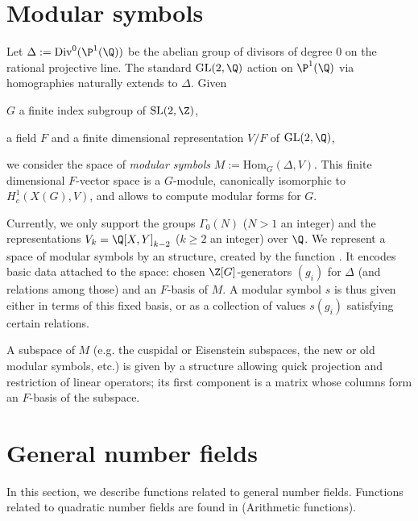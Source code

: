 
\section{Modular symbols}

Let $\Delta := \text{Div}^0(\P^1(\Q))$ be the abelian group of divisors of
degree $0$ on the rational projective line. The standard $\text{GL}(2,\Q)$
action on $\P^1(\Q)$ via homographies naturally extends to $\Delta$. Given

\item $G$ a finite index subgroup of $\text{SL}(2,\Z)$,

\item a field $F$ and a finite dimensional representation $V/F$ of
  $\text{GL}(2,\Q)$,

\noindent we consider the space of \emph{modular symbols} $M :=
\text{Hom}_G(\Delta, V)$. This finite dimensional $F$-vector
space is a $G$-module, canonically isomorphic to $H^1_c(X(G), V)$,
and allows to compute modular forms for $G$.

Currently, we only support the groups $\Gamma_0(N)$ ($N > 1$ an integer)
and the representations $V_k = \Q[X,Y]_{k-2}$ ($k \geq 2$ an integer) over
$\Q$. We represent a space of modular symbols by an  structure,
created by the function . It encodes basic data attached to the
space: chosen $\Z[G]$-generators $(g_i)$ for $\Delta$ (and relations among
those) and an $F$-basis of $M$. A modular symbol $s$ is thus given either in
terms of this fixed basis, or as a collection of values $s(g_i)$
satisfying certain relations.

A subspace of $M$ (e.g. the cuspidal or Eisenstein subspaces, the new or
old modular symbols, etc.) is given by a structure allowing quick projection
and restriction of linear operators; its first component is a matrix whose
columns  form  an $F$-basis  of the subspace.


\section{General number fields}

In this section, we describe functions related to general number fields.
Functions related to quadratic number fields are found in
 (Arithmetic functions).


